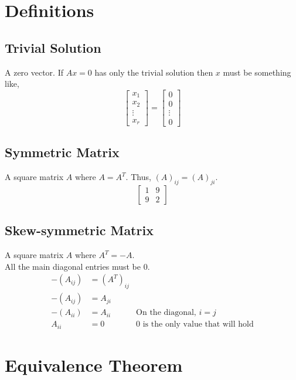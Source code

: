 \documentclass[12pt]{article}
\begin{document}
\section{Definitions}


\subsection{Trivial Solution}

A zero vector. If $Ax = 0$ has only the trivial solution then $x$ must be something like,
$$
\begin{bmatrix}
    x_1\\
    x_2\\
    \vdots\\
    x_r
\end{bmatrix}
=
\begin{bmatrix}
    0\\
    0\\
    \vdots\\
    0
\end{bmatrix}
$$


\subsection{Symmetric Matrix}

A square matrix $A$ where $A = A^T$. Thus, $(A)_{ij} = (A)_{ji}$.
$$
\begin{bmatrix}1 & 9\\9 & 2\end{bmatrix}
$$


\subsection{Skew-symmetric Matrix}

A square matrix $A$ where $A^T = -A$.\\
All the main diagonal entries must be 0.
\begin{align*}
    -(A_{ij}) &= (A^T)_{ij}\\
    -(A_{ij}) &= A_{ji}\\
    -(A_{ii}) &= A_{ii}&\text{On the diagonal, }i = j\\
    A_{ii} &= 0&\text{0 is the only value that will hold}
\end{align*}


\section{Equivalence Theorem}
\end{document}
